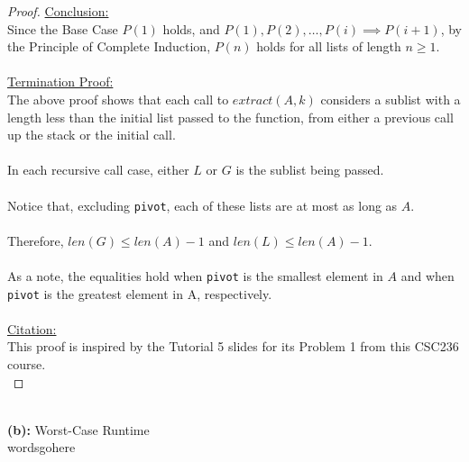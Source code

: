 \documentclass[12pt]{article}
\begin{document}
\begin{proof}
    \underline{Conclusion:} \\
    Since the Base Case $P(1)$ holds, and $P(1), P(2), \dots, P(i) \implies P(i + 1)$, by the Principle of Complete Induction, $P(n)$ holds for all lists of length $n \geq 1$. \\
    \\
    \underline{Termination Proof:} \\
    The above proof shows that each call to $extract(A, k)$ considers a sublist with a length less than the initial list passed to the function, from either a previous call up the stack or the initial call. \\
    \\
    In each recursive call case, either $L$ or $G$ is the sublist being passed. \\
    \\
    Notice that, excluding \texttt{pivot}, each of these lists are at most as long as $A$. \\
    \\
    Therefore, $len(G) \leq len(A) - 1$ and $len(L) \leq len(A) - 1$. \\
    \\
    As a note, the equalities hold when \texttt{pivot} is the smallest element in $A$ and when \texttt{pivot} is the greatest element in A, respectively. \\
    \\
    \underline{Citation:} \\
    This proof is inspired by the Tutorial 5 slides for its Problem 1 from this CSC236 course. \\
\end{proof}
\leavevmode\\
\textbf{(b):} Worst-Case Runtime \\
wordsgohere \\
\\
\pagebreak
\end{document}
